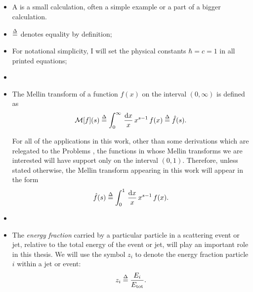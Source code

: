 \begin{itemize}
    \item
        A  is a small calculation, often a simple example or a part of a bigger calculation.

    \item
        \(\overset{\Delta}{=}\) denotes equality by definition;

    \item
        For notational simplicity, I will set the physical constants \(\hbar = c = 1\) in all printed equations;

    \item

    \item
        The Mellin transform of a function \(f(x)\) on the interval $(0,\infty)$ is defined as
        \begin{align}
            \mathcal{M}[f](s)
            \overset{\Delta}{=}
            \int_0^\infty \,\frac{\dd x}{x}\, x^{s-1} \, f(x)
            \overset{\Delta}{=}
            \hat f(s)
            .
        \end{align}

        For all of the applications in this work, other than some derivations which are relegated to the Problems , the functions in whose Mellin transforms we are interested will have support only on the interval \((0,1)\).
        Therefore, unless stated otherwise, the Mellin transform appearing in this work will appear in the form
        \begin{align}
            \hat f(s)
            \overset{\Delta}{=}
            \int_0^1 \,\frac{\dd x}{x}\, x^{s-1} \, f(x)
            .
        \end{align}



    \item

    \item
        The \textit{energy fraction} carried by a particular particle in a scattering event or jet, relative to the total energy of the event or jet, will play an important role in this thesis.
        We will use the symbol \(z_i\) to denote the energy fraction particle \(i\) within a jet or event:
        \begin{align}
            z_i
            \overset{\Delta}{=}
            \frac{E_i}{E_\text{tot}}
            .
        \end{align}


\end{itemize}

